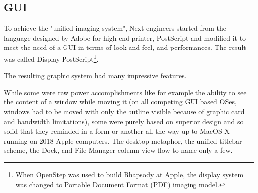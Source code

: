 \subsection{GUI}
 To achieve the "unified imaging system", Next engineers started from the language designed by Adobe for high-end printer, PostScript and modified it to meet the need of a GUI in terms of look and feel, and performances. The result was called Display PostScript\footnote{When OpenStep was used to build Rhapsody at Apple, the display system was changed to Portable Document Format (PDF) imaging model.}.\\
\par
{}
\par
The resulting graphic system had many impressive features.\\
\par
 While some were raw power accomplishments like for example the ability to see the content of a window while moving it (on all competing GUI based OSes, windows had to be moved with only the outline visible because of graphic card and bandwidth limitations), some were purely based on superior design and so solid that they reminded in a form or another all the way up to MacOS X running on 2018 Apple computers. The desktop metaphor, the unified titlebar scheme, the Dock, and File Manager column view flow to name only a few.





